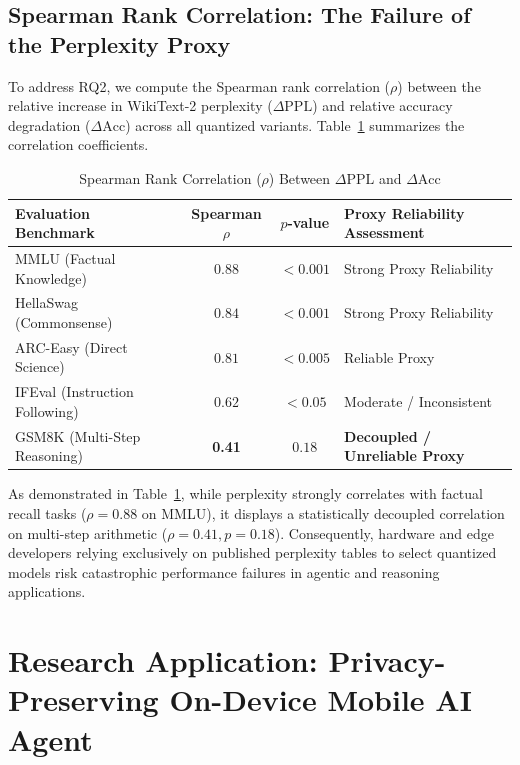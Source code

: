 \documentclass[12pt,a4paper,oneside]{report}
\begin{document}
\section{Spearman Rank Correlation: The Failure of the Perplexity Proxy}
To address RQ2, we compute the Spearman rank correlation ($\rho$) between the relative increase in WikiText-2 perplexity ($\Delta\text{PPL}$) and relative accuracy degradation ($\Delta\text{Acc}$) across all quantized variants. Table~\ref{tab:spearman} summarizes the correlation coefficients.

\begin{table}[h!]
\centering
\caption{Spearman Rank Correlation ($\rho$) Between $\Delta\text{PPL}$ and $\Delta\text{Acc}$}
\label{tab:spearman}
\renewcommand{\arraystretch}{1.2}
\begin{tabular}{lccl}
\toprule
\textbf{Evaluation Benchmark} & \textbf{Spearman $\rho$} & \textbf{$p$-value} & \textbf{Proxy Reliability Assessment} \\
\midrule
MMLU (Factual Knowledge) & $0.88$ & $< 0.001$ & Strong Proxy Reliability \\
HellaSwag (Commonsense) & $0.84$ & $< 0.001$ & Strong Proxy Reliability \\
ARC-Easy (Direct Science) & $0.81$ & $< 0.005$ & Reliable Proxy \\
IFEval (Instruction Following) & $0.62$ & $< 0.05$ & Moderate / Inconsistent \\
GSM8K (Multi-Step Reasoning) & \textbf{0.41} & $0.18$ & \textbf{Decoupled / Unreliable Proxy} \\
\bottomrule
\end{tabular}
\end{table}

As demonstrated in Table~\ref{tab:spearman}, while perplexity strongly correlates with factual recall tasks ($\rho = 0.88$ on MMLU), it displays a statistically decoupled correlation on multi-step arithmetic ($\rho = 0.41, p = 0.18$). Consequently, hardware and edge developers relying exclusively on published perplexity tables to select quantized models risk catastrophic performance failures in agentic and reasoning applications.

\chapter{Research Application: Privacy-Preserving On-Device Mobile AI Agent}
\end{document}
